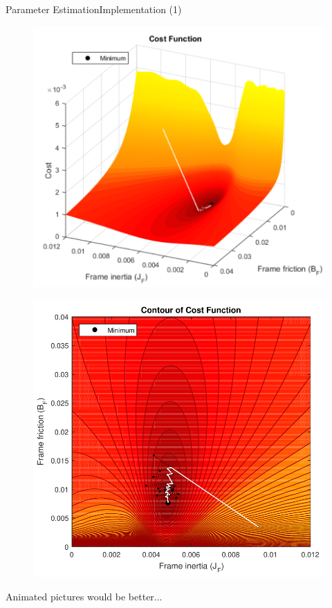 \begin{frame}{Parameter Estimation}{Implementation (1)}
  \begin{minipage}{\linewidth}\centering
    \begin{minipage}{0.35\linewidth}
      \begin{figure}[H]
        \centering
        \includegraphics[scale=0.35]{Pictures/costFunctionMinimized.pdf}
      \end{figure}
    \end{minipage}
    \hspace{0.15\linewidth}
    \begin{minipage}{0.45\linewidth}
      \begin{figure}[H]
        \centering
        \includegraphics[scale=0.35]{Pictures/costFunctionMinimizedContour.pdf}
      \end{figure}
    \end{minipage}
  \end{minipage}
  Animated pictures would be better...
\end{frame}

